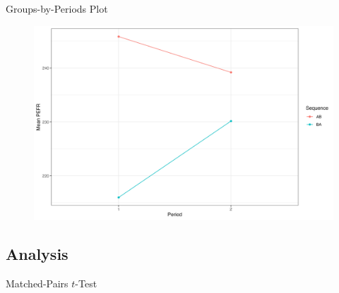 \documentclass{beamer}
\begin{document}
\begin{frame}{Groups-by-Periods Plot}
    \begin{figure}
        \centering
        \includegraphics[width=\linewidth]{report/figures/ch2/groupsByPeriodsPlot.png}
    \end{figure}
\end{frame}

\subsection{Analysis}
\begin{frame}{Matched-Pairs $t$-Test}
    
\end{frame}
\end{document}
